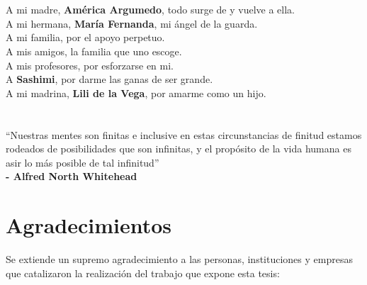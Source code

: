 \documentclass[12pt,oneside,letterpaper]{book}
\begin{document}


\chapter*{}
\thispagestyle{empty}
    \null{}
        \begin{flushright}
            A mi madre, \textbf{América Argumedo}, todo surge de y vuelve a ella. \\
            A mi hermana, \textbf{María Fernanda}, mi ángel de la guarda. \\
            A mi familia, por el apoyo perpetuo. \\
            A mis amigos, la familia que uno escoge. \\
            A mis profesores, por esforzarse en mi. \\
            A \textbf{Sashimi}, por darme las ganas de ser grande. \\
            A mi madrina, \textbf{Lili de la Vega}, por amarme como un hijo.
        \end{flushright}
\null{}

\chapter*{}
% 
\begin{minipage}[t]{0.6\textwidth}
    \begin{flushleft}
        \large
        ``Nuestras mentes son finitas e inclusive en estas circunstancias de
        finitud estamos rodeados de posibilidades que son infinitas, y el
        propósito de la vida humana es asir lo más posible de tal infinitud'' \\
        \textbf{- Alfred North Whitehead}
    \end{flushleft}
\end{minipage}



\chapter*{Agradecimientos}
Se extiende un supremo agradecimiento a las personas, instituciones y empresas
que catalizaron la realización del trabajo que expone esta tesis:
\end{document}
